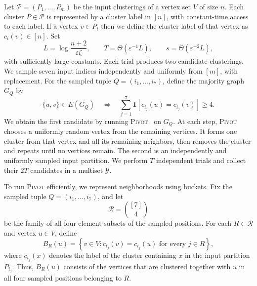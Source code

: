 \documentclass[11pt]{article}
\theoremstyle{definition}
\theoremstyle{remark}
\newcommand{\1}{\mathbf{1}}
\begin{document}
Let $\mathcal P=(P_1,\ldots,P_m)$ be the input clusterings
of a vertex set $V$ of size $n$. Each cluster $P \in \mathcal{P}$ is represented by a cluster label in $[n]$, with constant-time access to each label. If a vertex $v \in P_i$ then we define the cluster label of that vertex as $c_i(v) \in [n]$. Set
\[
    L=\log\frac{n+2}{\varepsilon\zeta},
    \qquad
    T=\Theta(\varepsilon^{-1}L),
    \qquad
    s=\Theta(\varepsilon^{-2}L),
\]
with sufficiently large constants. Each trial produces two candidate clusterings. We sample
seven input indices independently and uniformly from $[m]$,
with replacement. For the sampled tuple $Q=(i_1,\ldots,i_7)$,
define the majority graph $G_Q$ by
\[
    \{u,v\}\in E(G_Q)
    \quad\Longleftrightarrow\quad
    \sum_{j=1}^{7}
        \mathbf{1}[c_{i_j}(u)=c_{i_j}(v)]\ge 4.
\]
We obtain the first candidate by running \textsc{Pivot}~\cite{ACN2008} on $G_Q$. At each step, \textsc{Pivot} chooses a uniformly random vertex from the remaining vertices. It forms one cluster from that vertex and all its remaining neighbors, then removes the cluster and repeats until no vertices remain. The second is an independently and uniformly sampled input partition. We perform $T$ independent trials and collect their $2T$ candidates in a multiset $\mathcal Y$.

To run \textsc{Pivot} efficiently, we represent neighborhoods
using buckets. Fix the sampled tuple $Q=(i_1,\ldots,i_7)$, and let
\[
    \mathcal{R}=\binom{[7]}{4}
\]
be the family of all four-element subsets of the sampled
positions. For each $R\in\mathcal{R}$ and vertex $u\in V$,
define
\[
    B_R(u)
    =
    \left\{
        v\in V :
        c_{i_j}(v)=c_{i_j}(u)
        \text{ for every }j\in R
    \right\},
\]
where $c_{i_j}(x)$ denotes the label of the cluster containing
$x$ in the input partition $P_{i_j}$. Thus, $B_R(u)$ consists
of the vertices that are clustered together with $u$ in
all four sampled positions belonging to $R$.
\end{document}
